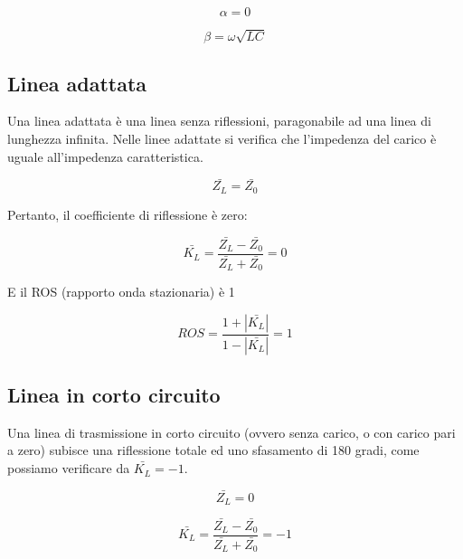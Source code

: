 \documentclass{article}
\begin{document}
    \begin{equation}
        \alpha = 0
    \end{equation}

    \begin{equation}    
        \beta = \omega \sqrt{LC}
    \end{equation}

    \subsection{Linea adattata}

    Una linea adattata è una linea senza riflessioni, paragonabile ad una linea di lunghezza infinita.
    Nelle linee adattate si verifica che l'impedenza del carico è uguale all'impedenza caratteristica.

    \begin{equation}
        \bar{Z_L} = \bar{Z_0}
    \end{equation}

    Pertanto, il coefficiente di riflessione è zero:

    \begin{equation}
        \bar{K_L} = \frac{
            \bar{Z_L} - \bar{Z_0}
        }{
            \bar{Z_L} + \bar{Z_0}
        } = 0
    \end{equation}

    E il ROS (rapporto onda stazionaria) è 1

    \begin{equation}
        ROS = \frac{
            1 + |\bar{K_L}|
        }{
            1 - |\bar{K_L}|
        } = 1
    \end{equation}

    \subsection{Linea in corto circuito}

    Una linea di trasmissione in corto circuito (ovvero senza carico, o con carico pari a zero) subisce una riflessione
    totale ed uno sfasamento di 180 gradi, come possiamo verificare da $\bar{K_L} = -1$.

    \begin{equation}
        \bar{Z_L} = 0
    \end{equation}

    \begin{equation}
        \bar{K_L} = \frac{
            \bar{Z_L} - \bar{Z_0}
        }{
            \bar{Z_L} + \bar{Z_0}
        } = -1
    \end{equation}
\end{document}
